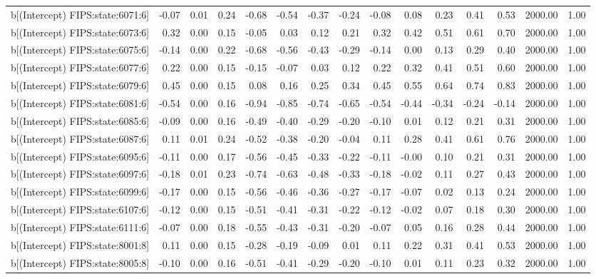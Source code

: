 \begin{table}[ht]
\begin{tabular}{rrrrrrrrrrrrrrr}
  b[(Intercept) FIPS:state:6071:6] & -0.07 & 0.01 & 0.24 & -0.68 & -0.54 & -0.37 & -0.24 & -0.08 & 0.08 & 0.23 & 0.41 & 0.53 & 2000.00 & 1.00 \\ 
  b[(Intercept) FIPS:state:6073:6] & 0.32 & 0.00 & 0.15 & -0.05 & 0.03 & 0.12 & 0.21 & 0.32 & 0.42 & 0.51 & 0.61 & 0.70 & 2000.00 & 1.00 \\ 
  b[(Intercept) FIPS:state:6075:6] & -0.14 & 0.00 & 0.22 & -0.68 & -0.56 & -0.43 & -0.29 & -0.14 & 0.00 & 0.13 & 0.29 & 0.40 & 2000.00 & 1.00 \\ 
  b[(Intercept) FIPS:state:6077:6] & 0.22 & 0.00 & 0.15 & -0.15 & -0.07 & 0.03 & 0.12 & 0.22 & 0.32 & 0.41 & 0.51 & 0.60 & 2000.00 & 1.00 \\ 
  b[(Intercept) FIPS:state:6079:6] & 0.45 & 0.00 & 0.15 & 0.08 & 0.16 & 0.25 & 0.34 & 0.45 & 0.55 & 0.64 & 0.74 & 0.83 & 2000.00 & 1.00 \\ 
  b[(Intercept) FIPS:state:6081:6] & -0.54 & 0.00 & 0.16 & -0.94 & -0.85 & -0.74 & -0.65 & -0.54 & -0.44 & -0.34 & -0.24 & -0.14 & 2000.00 & 1.00 \\ 
  b[(Intercept) FIPS:state:6085:6] & -0.09 & 0.00 & 0.16 & -0.49 & -0.40 & -0.29 & -0.20 & -0.10 & 0.01 & 0.12 & 0.21 & 0.31 & 2000.00 & 1.00 \\ 
  b[(Intercept) FIPS:state:6087:6] & 0.11 & 0.01 & 0.24 & -0.52 & -0.38 & -0.20 & -0.04 & 0.11 & 0.28 & 0.41 & 0.61 & 0.76 & 2000.00 & 1.00 \\ 
  b[(Intercept) FIPS:state:6095:6] & -0.11 & 0.00 & 0.17 & -0.56 & -0.45 & -0.33 & -0.22 & -0.11 & -0.00 & 0.10 & 0.21 & 0.31 & 2000.00 & 1.00 \\ 
  b[(Intercept) FIPS:state:6097:6] & -0.18 & 0.01 & 0.23 & -0.74 & -0.63 & -0.48 & -0.33 & -0.18 & -0.02 & 0.11 & 0.27 & 0.43 & 2000.00 & 1.00 \\ 
  b[(Intercept) FIPS:state:6099:6] & -0.17 & 0.00 & 0.15 & -0.56 & -0.46 & -0.36 & -0.27 & -0.17 & -0.07 & 0.02 & 0.13 & 0.24 & 2000.00 & 1.00 \\ 
  b[(Intercept) FIPS:state:6107:6] & -0.12 & 0.00 & 0.15 & -0.51 & -0.41 & -0.31 & -0.22 & -0.12 & -0.02 & 0.07 & 0.18 & 0.30 & 2000.00 & 1.00 \\ 
  b[(Intercept) FIPS:state:6111:6] & -0.07 & 0.00 & 0.18 & -0.55 & -0.43 & -0.31 & -0.20 & -0.07 & 0.05 & 0.16 & 0.28 & 0.44 & 2000.00 & 1.00 \\ 
  b[(Intercept) FIPS:state:8001:8] & 0.11 & 0.00 & 0.15 & -0.28 & -0.19 & -0.09 & 0.01 & 0.11 & 0.22 & 0.31 & 0.41 & 0.53 & 2000.00 & 1.00 \\ 
  b[(Intercept) FIPS:state:8005:8] & -0.10 & 0.00 & 0.16 & -0.51 & -0.41 & -0.29 & -0.20 & -0.10 & 0.01 & 0.11 & 0.23 & 0.32 & 2000.00 & 1.00 \\ 

\end{tabular}
\end{table}
